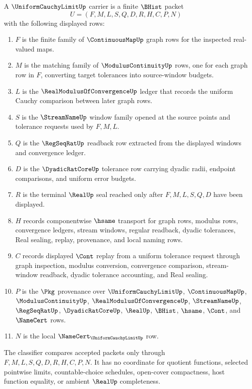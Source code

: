 \begin{definition}
\label{def:uniform-cauchy-limit-carrier}
A $\UniformCauchyLimitUp$ carrier is a finite $\BHist$ packet
$$
U=(F,M,L,S,Q,D,R,H,C,P,N)
$$
with the following displayed rows:
\begin{enumerate}
\item $F$ is the finite family of $\ContinuousMapUp$ graph rows for the inspected real-valued maps.
\item $M$ is the matching family of $\ModulusContinuityUp$ rows, one for each graph row in $F$, converting target tolerances into source-window budgets.
\item $L$ is the $\RealModulusOfConvergenceUp$ ledger that records the uniform Cauchy comparison between later graph rows.
\item $S$ is the $\StreamNameUp$ window family opened at the source points and tolerance requests used by $F,M,L$.
\item $Q$ is the $\RegSeqRatUp$ readback row extracted from the displayed windows and convergence ledger.
\item $D$ is the $\DyadicRatCoreUp$ tolerance row carrying dyadic radii, endpoint comparisons, and uniform error budgets.
\item $R$ is the terminal $\RealUp$ seal reached only after $F,M,L,S,Q,D$ have been displayed.
\item $H$ records componentwise $\hsame$ transport for graph rows, modulus rows, convergence ledgers, stream windows, regular readback, dyadic tolerances, Real sealing, replay, provenance, and local naming rows.
\item $C$ records displayed $\Cont$ replay from a uniform tolerance request through graph inspection, modulus conversion, convergence comparison, stream-window readback, dyadic tolerance accounting, and Real sealing.
\item $P$ is the $\Pkg$ provenance over $\UniformCauchyLimitUp$, $\ContinuousMapUp$, $\ModulusContinuityUp$, $\RealModulusOfConvergenceUp$, $\StreamNameUp$, $\RegSeqRatUp$, $\DyadicRatCoreUp$, $\RealUp$, $\BHist$, $\hsame$, $\Cont$, and $\NameCert$ rows.
\item $N$ is the local $\NameCert_{\UniformCauchyLimitUp}$ row.
\end{enumerate}
The classifier compares accepted packets only through $F,M,L,S,Q,D,R,H,C,P,N$. It has no coordinate for quotient functions, selected pointwise limits, countable-choice schedules, open-cover compactness, host function equality, or ambient $\RealUp$ completeness.
\end{definition}

